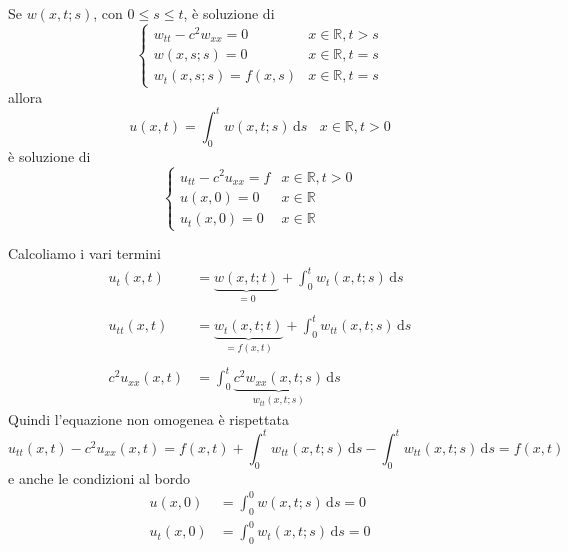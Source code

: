 \documentclass[10pt,a4paper,twoside,openright]{book}
\newcommand{\de}{\,\mathrm d}
\newcommand{\ds}{\de s}
\begin{document}
\begin{theorem}
     Se $\displaystyle w(x,t;s)$, con $\displaystyle 0\leqslant s\leqslant t$, è soluzione di
    \begin{equation*}
        \begin{cases}
            w_{tt} -c^{2} w_{xx} =\boxed{0} & x\in \mathbb{R} ,\boxed{t >s} \\
            w(x,s;s) =0                     & x\in \mathbb{R} ,t=s          \\
            w_{t}(x,s;s) =f(x,s)            & x\in \mathbb{R} ,t=s
        \end{cases}
    \end{equation*}
    allora
    \begin{equation*}
        u(x,t) =\int _{0}^{t} w(x,t;s) \ds\ \ \ \ x\in \mathbb{R} ,t >0
    \end{equation*}
    è soluzione di
    \begin{equation*}
        \begin{cases}
            u_{tt} -c^{2} u_{xx} =f & x\in \mathbb{R} ,t >0 \\
            u(x,0) =0               & x\in \mathbb{R}       \\
            u_{t}(x,0) =0           & x\in \mathbb{R}
        \end{cases}
    \end{equation*}
\end{theorem}
\begin{dimostrazione}
    Calcoliamo i vari termini
    \begin{align*}
        u_{t}(x,t)        & =\underbrace{w(x,t;t)}_{=0} +\int _{0}^{t} w_{t}(x,t;s) \ds           \\
                          &                                                                       \\
        u_{tt}(x,t)       & =\underbrace{w_{t}(x,t;t)}_{=f(x,t)} +\int _{0}^{t} w_{tt}(x,t;s) \ds \\
                          &                                                                       \\
        c^{2} u_{xx}(x,t) & =\int _{0}^{t}\underbrace{c^{2} w_{xx}(x,t;s)}_{w_{tt}(x,t;s)} \ds
    \end{align*}
    Quindi l'equazione non omogenea è rispettata
    \begin{equation*}
        u_{tt}(x,t) -c^{2} u_{xx}(x,t) =f(x,t) +\int _{0}^{t} w_{tt}(x,t;s) \ds-\int _{0}^{t} w_{tt}(x,t;s) \ds=f(x,t)
    \end{equation*}
    e anche le condizioni al bordo
    \begin{align*}
        u(x,0)     & =\int _{0}^{0} w(x,t;s) \ds=0     \\
        u_{t}(x,0) & =\int _{0}^{0} w_{t}(x,t;s) \ds=0
    \end{align*}
\end{dimostrazione}
\end{document}
